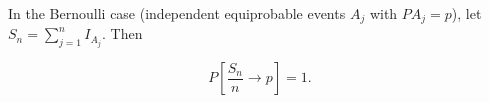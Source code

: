 In the Bernoulli case (independent equiprobable events $A_j$ with $PA_j = p$), let $S_n = \sum_{j=1}^{n} I_{A_j}$. Then

$$P\left[\frac{S_n}{n} \to p\right] = 1.$$
